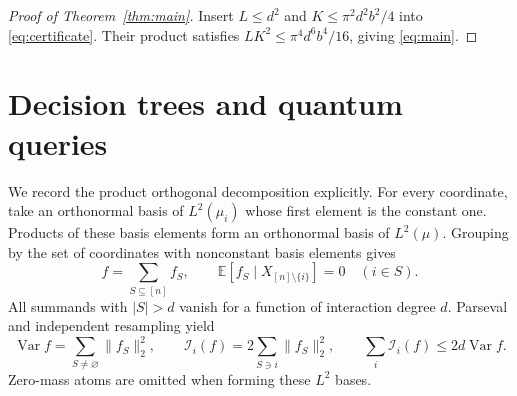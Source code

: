 \documentclass[11pt,reqno]{amsart}
\theoremstyle{definition}
\theoremstyle{remark}
\newcommand{\E}{\mathbb E}
\newcommand{\Var}{\operatorname{Var}}
\newcommand{\cI}{\mathcal I}
\numberwithin{equation}{section}
\begin{document}
\begin{proof}[Proof of Theorem~\ref{thm:main}]
Insert $L\le d^2$ and $K\le\pi^2d^2b^2/4$ into
\eqref{eq:certificate}. Their product satisfies
$LK^2\le\pi^4d^6b^4/16$, giving \eqref{eq:main}.
\end{proof}

\section{Decision trees and quantum queries}

We record the product orthogonal decomposition explicitly. For every
coordinate, take an orthonormal basis of $L^2(\mu_i)$ whose first element
is the constant one. Products of these basis elements form an
orthonormal basis of $L^2(\mu)$. Grouping by the set of coordinates with
nonconstant basis elements gives
\[
 f=\sum_{S\subseteq[n]}f_S,\qquad
 \E[f_S\mid X_{[n]\setminus\{i\}}]=0\quad(i\in S).
\]
All summands with $|S|>d$ vanish for a function of interaction degree $d$.
Parseval and independent resampling yield
\begin{equation}\label{eq:anova}
 \Var f=\sum_{S\ne\varnothing}\|f_S\|_2^2,\qquad
 \cI_i(f)=2\sum_{S\ni i}\|f_S\|_2^2,
 \qquad\sum_i\cI_i(f)\le2d\Var f.
\end{equation}
Zero-mass atoms are omitted when forming these $L^2$ bases.
\end{document}
